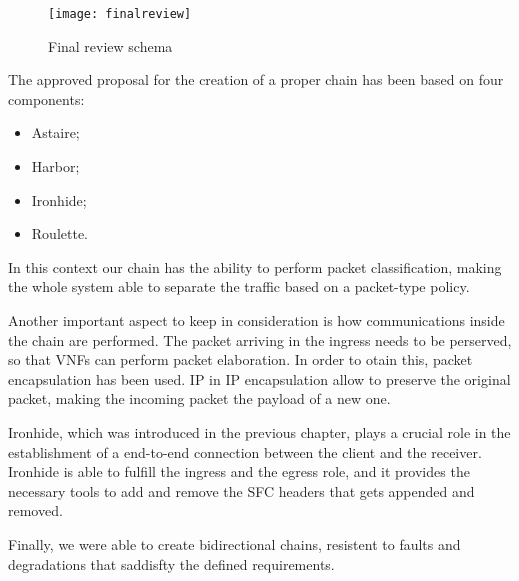 \begin{figure}[t]
  \centering
  \texttt{[image: finalreview]}
  \caption{Final review schema}
  \label{chap:impl:img:finalreview}
\end{figure}

The approved proposal for the creation of a proper chain has been based on four components:
\begin{itemize}
\item Astaire;
\item Harbor;
\item Ironhide;
\item Roulette.
\end{itemize}

In this context our chain has the ability to perform packet classification,
making the whole system able to separate the traffic based on a packet-type
policy. 

Another important aspect to keep in consideration is how communications inside
the chain are performed. The packet arriving in the ingress needs to be
perserved, so that VNFs can perform packet elaboration. In order to otain this,
packet encapsulation has been used. IP in IP encapsulation allow to preserve the
original packet, making the incoming packet the payload of a new one.

Ironhide, which was introduced in the previous chapter, plays a crucial role in
the establishment of a end-to-end connection between the client and the
receiver. Ironhide is able to fulfill the ingress and the egress role, and it
provides the necessary tools to add and remove the SFC headers that gets appended
and removed.

Finally, we were able to create bidirectional chains, resistent to faults and
degradations that saddisfty the defined requirements.

